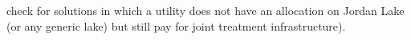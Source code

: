 
\begin{DoxyRefList}
\item[\label{todo__todo000001}%
\Hypertarget{todo__todo000001}%
Member \mbox{\hyperlink{classTriangle_a9e95039d098fd61cce1a830b85ed7004}{Triangle\+:\+:function\+Evaluation}} (double $\ast$vars, double $\ast$objs, double $\ast$consts) override]check for solutions in which a utility does not have an allocation on Jordan Lake (or any generic lake) but still pay for joint treatment infrastructure). 
\end{DoxyRefList}